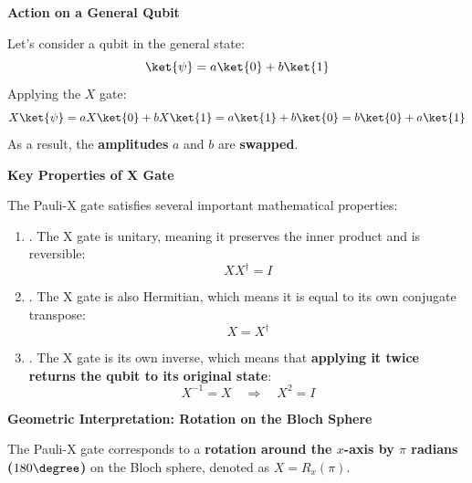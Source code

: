 \highspace
\begin{flushleft}
   \textcolor{Green3}{ \textbf{Action on a General Qubit}}
\end{flushleft}
Let's consider a qubit in the general state:
\begin{equation*}
   \ket{\psi} = a\ket{0} + b\ket{1}
\end{equation*}
Applying the $X$ gate:
\begin{equation*}
   X\ket{\psi} = a X \ket{0} + b X \ket{1} = a \ket{1} + b \ket{0} = b \ket{0} + a \ket{1}
\end{equation*}
As a result, the \textbf{amplitudes} $a$ and $b$ are \textbf{swapped}.

\highspace
\begin{flushleft}
   \textcolor{Green3}{ \textbf{Key Properties of X Gate}}
\end{flushleft}
The Pauli-X gate satisfies several important mathematical properties:
\begin{enumerate}
   \item {}. The X gate is unitary, meaning it preserves the inner product and is reversible:
   \begin{equation*}
      X X^{\dagger} = I
   \end{equation*}


   \item {}. The X gate is also Hermitian, which means it is equal to its own conjugate transpose:
   \begin{equation*}
      X = X^{\dagger}
   \end{equation*}


   \item {}. The X gate is its own inverse, which means that \textbf{applying it twice returns the qubit to its original state}:
   \begin{equation*}
      X^{-1} = X \quad \Rightarrow \quad X^{2} = I
   \end{equation*}
\end{enumerate}

\highspace
\begin{flushleft}
   \textcolor{Green3}{ \textbf{Geometric Interpretation: Rotation on the Bloch Sphere}}
\end{flushleft}
The Pauli-X gate corresponds to a \textbf{rotation around the $x$-axis by $\pi$ radians ($180\degree$)} on the Bloch sphere, denoted as $X = R_{x}(\pi)$.

